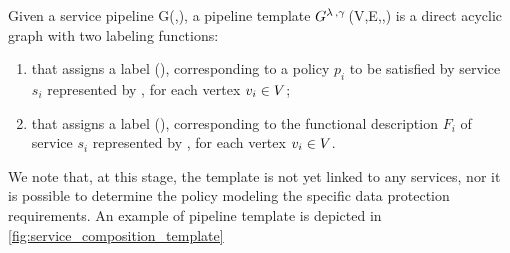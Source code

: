 \begin{definition} \label{def:template}
  Given a service pipeline G(\V,\E), a pipeline template $G^{\lambda\,,\gamma\,}$(V,E,\myLambda,\myGamma) is a direct acyclic graph with two labeling functions:
  \begin{enumerate}[label=\roman*)]
    \item \myLambda that assigns a label \myLambda(), corresponding to a policy $p_i$ to be satisfied by service $s_i$ represented by , for each vertex $v_{i}\in V$;
    \item \myGamma that assigns a label \myGamma(), corresponding to the functional description $F_i$ of service $s_i$ represented by , for each vertex $v_{i}\in V$.
  \end{enumerate}
\end{definition}

We note that, at this stage, the template is not yet linked to any services, nor it is possible to determine the policy modeling the specific data protection requirements.
An example of pipeline template is depicted in \cref{fig:service_composition_template}

